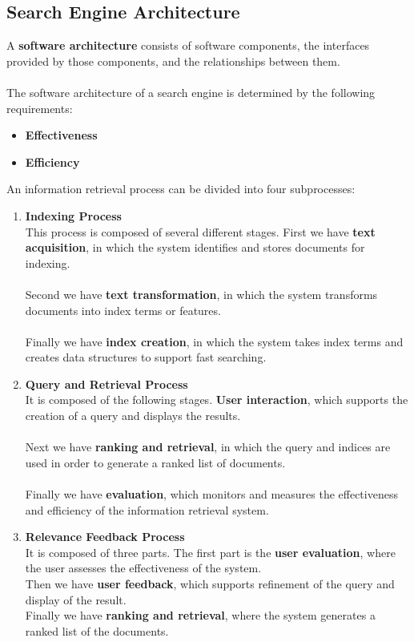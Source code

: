 \documentclass{article}
\begin{document}
\subsection{Search Engine Architecture}
A \textbf{software architecture} consists of software components, the interfaces provided by those components, and the relationships between them. \\ \\
The software architecture of a search engine is determined by the following requirements:

\begin{itemize}
	\item \textbf{Effectiveness}
	\item \textbf{Efficiency}
\end{itemize}
An information retrieval process can be divided into four subprocesses:

\begin{enumerate}
	\item \textbf{Indexing Process}
	\vspace{.2cm} \\
	This process is composed of several different stages. First we have \textbf{text acquisition}, in which the system identifies and stores documents for indexing. \\ \\
	Second we have \textbf{text transformation}, in which the system transforms documents into index terms or features. \\ \\
	Finally we have \textbf{index creation}, in which the system takes index terms and creates data structures to support fast searching.
	
	\item \textbf{Query and Retrieval Process}
	\vspace{.2cm} \\
	It is composed of the following stages. \textbf{User interaction}, which supports the creation of a query and displays the results. \\ \\
	Next we have \textbf{ranking and retrieval}, in which the query and indices are used in order to generate a ranked list of documents. \\ \\
	Finally we have \textbf{evaluation}, which monitors and measures the effectiveness and efficiency of the information retrieval system.
	
	\item \textbf{Relevance Feedback Process}
	\vspace{.2cm} \\
	It is composed of three parts. The first part is the \textbf{user evaluation}, where the user assesses the effectiveness of the system. \\ 
	Then we have \textbf{user feedback}, which supports refinement of the query and display of the result.\\
	Finally we have \textbf{ranking and retrieval}, where the system generates a ranked list of the documents.
\end{enumerate}
\end{document}
